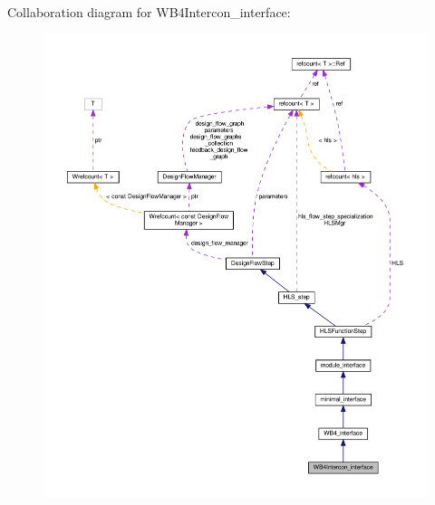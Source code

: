 Collaboration diagram for W\+B4\+Intercon\+\_\+interface\+:
\nopagebreak
\begin{figure}[H]
\begin{center}
\leavevmode
\includegraphics[width=350pt]{d5/d89/classWB4Intercon__interface__coll__graph}
\end{center}
\end{figure}
